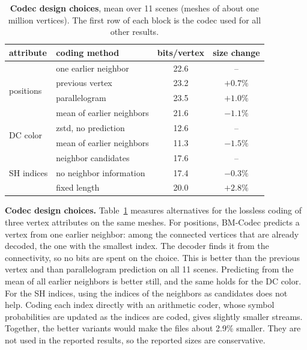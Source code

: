 \begin{table}[t]\centering\footnotesize
\caption{\textbf{Codec design choices}, mean over 11 scenes (meshes of about one million vertices). The first row of each block is the codec used for all other results.}
\label{tab:codec-abl}
\setlength{\tabcolsep}{4pt}
\begin{tabular}{@{}llcc@{}}
\toprule
attribute & coding method & bits/vertex & size change \\
\midrule
\multirow{4}{*}{positions} & one earlier neighbor & 22.6 & -- \\
 & previous vertex & 23.2 & $+0.7\%$ \\
 & parallelogram & 23.5 & $+1.0\%$ \\
 & mean of earlier neighbors & 21.6 & $-1.1\%$ \\
\midrule
\multirow{2}{*}{DC color} & zstd, no prediction & 12.6 & -- \\
 & mean of earlier neighbors & 11.3 & $-1.5\%$ \\
\midrule
\multirow{3}{*}{SH indices} & neighbor candidates & 17.6 & -- \\
 & no neighbor information & 17.4 & $-0.3\%$ \\
 & fixed length & 20.0 & $+2.8\%$ \\
\bottomrule
\end{tabular}
\end{table}

\noindent\textbf{Codec design choices.} Table~\ref{tab:codec-abl} measures alternatives for the lossless coding of three vertex attributes on the same meshes. For positions, BM-Codec predicts a vertex from one earlier neighbor: among the connected vertices that are already decoded, the one with the smallest index. The decoder finds it from the connectivity, so no bits are spent on the choice. This is better than the previous vertex and than parallelogram prediction on all 11 scenes. Predicting from the mean of all earlier neighbors is better still, and the same holds for the DC color. For the SH indices, using the indices of the neighbors as candidates does not help. Coding each index directly with an arithmetic coder, whose symbol probabilities are updated as the indices are coded, gives slightly smaller streams. Together, the better variants would make the files about 2.9\% smaller. They are not used in the reported results, so the reported sizes are conservative.

